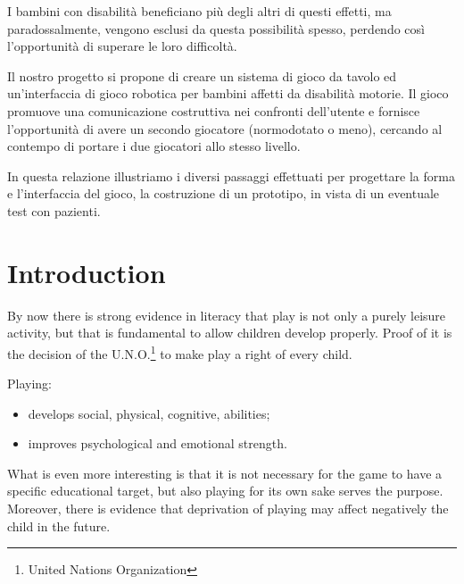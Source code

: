\documentclass[a4paper,twoside]{book}
\begin{document}
I bambini con disabilit\`{a} beneficiano pi\`{u} degli altri di questi effetti, ma paradossalmente, vengono esclusi da questa possibilit\`{a} spesso, perdendo cos\`{i} l'opportunit\`{a} di superare le loro difficolt\`{a}.

Il nostro progetto si propone di creare un sistema di gioco da tavolo ed un'interfaccia di gioco robotica per bambini affetti da disabilit\`{a} motorie. Il gioco promuove una comunicazione costruttiva nei confronti dell'utente e fornisce l'opportunit\`{a} di avere un secondo giocatore (normodotato o meno), cercando al contempo di portare i due giocatori allo stesso livello.

In questa relazione illustriamo i diversi passaggi effettuati per progettare la forma e l'interfaccia del gioco, la costruzione di un prototipo, in vista di un eventuale test con pazienti.
 
\chapter{Introduction}

By now there is strong evidence in literacy that play is not only a purely leisure activity, but that is fundamental to allow children develop properly. Proof of it is the decision of the U.N.O.\footnote{United Nations Organization} to make play a right of every child. 

\beforelist Playing:
\begin{itemize}
\item develops social, physical, cognitive, abilities;
\item  improves psychological and emotional strength.
\end{itemize}
\afterlist*
What is even more interesting is that it is not necessary for the game to have a specific educational target, but also playing for its own sake serves the purpose. Moreover, there is evidence that  deprivation of playing may affect negatively the child in the future.
\end{document}
